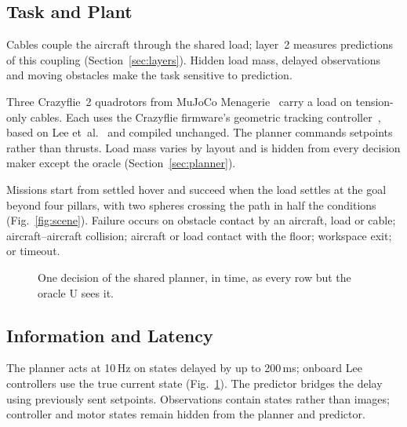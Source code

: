 \documentclass[conference]{IEEEtran}
\begin{document}
\subsection{Task and Plant}
Cables couple the aircraft through the shared load; layer~2 measures predictions of this coupling (Section~\ref{sec:layers}). Hidden load mass, delayed observations and moving obstacles make the task sensitive to prediction.

Three Crazyflie~2 quadrotors from MuJoCo Menagerie~\cite{todorov2012mujoco,menagerie2022github} carry a load on tension-only cables. Each uses the Crazyflie firmware's geometric tracking controller~\cite{imrclab2024firmware}, based on Lee et~al.~\cite{lee2010geometric} and compiled unchanged. The planner commands setpoints rather than thrusts. Load mass varies by layout and is hidden from every decision maker except the oracle (Section~\ref{sec:planner}).

Missions start from settled hover and succeed when the load settles at the goal beyond four pillars, with two spheres crossing the path in half the conditions (Fig.~\ref{fig:scene}). Failure occurs on obstacle contact by an aircraft, load or cable; aircraft--aircraft collision; aircraft or load contact with the floor; workspace exit; or timeout.

\begin{figure}[t]
\centering

\caption{One decision of the shared planner, in time, as every row but the oracle U sees it.}
\label{fig:decision}
\end{figure}

\subsection{Information and Latency}
The planner acts at 10\,Hz on states delayed by up to 200\,ms; onboard Lee controllers use the true current state (Fig.~\ref{fig:decision}). The predictor bridges the delay using previously sent setpoints. Observations contain states rather than images; controller and motor states remain hidden from the planner and predictor.
\end{document}
